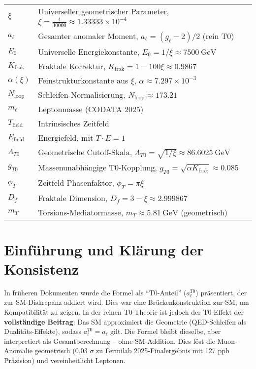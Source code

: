 \documentclass[12pt,a4paper]{article}
\begin{document}
	\begin{tabular}{ll}
		$\xi$ & Universeller geometrischer Parameter, $\xi = \frac{4}{30000} \approx 1.33333 \times 10^{-4}$ \\
		$a_\ell$ & Gesamter anomaler Moment, $a_\ell = (g_\ell - 2)/2$ (rein T0) \\
		$E_0$ & Universelle Energiekonstante, $E_0 = 1/\xi \approx \SI{7500}{\giga\electronvolt}$ \\
		$K_\text{frak}$ & Fraktale Korrektur, $K_\text{frak} = 1 - 100 \xi \approx 0.9867$ \\
		$\alpha(\xi)$ & Feinstrukturkonstante aus $\xi$, $\alpha \approx 7.297 \times 10^{-3}$ \\
		$N_\text{loop}$ & Schleifen-Normalisierung, $N_\text{loop} \approx 173.21$ \\
		$m_\ell$ & Leptonmasse (CODATA 2025) \\
		$T_\text{field}$ & Intrinsisches Zeitfeld \\
		$E_\text{field}$ & Energiefeld, mit $T \cdot E = 1$ \\
		$\Lambda_{T0}$ & Geometrische Cutoff-Skala, $\Lambda_{T0} = \sqrt{1/\xi} \approx \SI{86.6025}{\giga\electronvolt}$ \\
		$g_{T0}$ & Massenunabhängige T0-Kopplung, $g_{T0} = \sqrt{\alpha K_\text{frak}} \approx 0.085$ \\
		$\phi_T$ & Zeitfeld-Phasenfaktor, $\phi_T = \pi \xi$ \\
		$D_f$ & Fraktale Dimension, $D_f = 3 - \xi \approx 2.999867$ \\
		$m_T$ & Torsions-Mediatormasse, $m_T \approx \SI{5.81}{\giga\electronvolt}$ (geometrisch) \\
	\end{tabular}
	
	\section{Einführung und Klärung der Konsistenz}
	In früheren Dokumenten wurde die Formel als ``T0-Anteil'' ($a_\ell^{T0}$) präsentiert, der zur SM-Diskrepanz addiert wird. Dies war eine Brückenkonstruktion zur SM, um Kompatibilität zu zeigen. In der reinen T0-Theorie \cite{T0_SI} ist jedoch der T0-Effekt der \textbf{vollständige Beitrag}: Das SM approximiert die Geometrie (QED-Schleifen als Dualitäts-Effekte), sodass $a_\ell^{T0} = a_\ell$ gilt. Die Formel bleibt dieselbe, aber interpretiert als Gesamtberechnung -- ohne SM-Addition. Dies löst die Muon-Anomalie geometrisch (0.03 $\sigma$ zu Fermilab 2025-Finalergebnis mit 127 ppb Präzision) und vereinheitlicht Leptonen.
	
\end{document}

